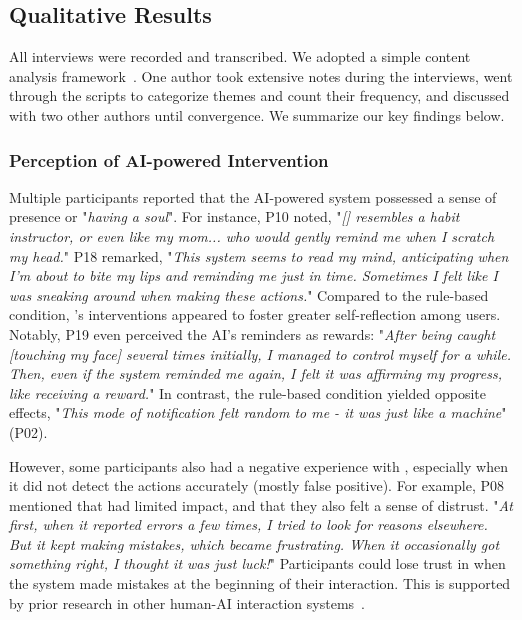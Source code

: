 \subsection{Qualitative Results}
\label{sub:intervention_evaluation:qualitative_results}
All interviews were recorded and transcribed. We adopted a simple content analysis framework~\cite{prior2014content}. One author took extensive notes during the interviews, went through the scripts to categorize themes and count their frequency, and discussed with two other authors until convergence.
We summarize our key findings below.


\subsubsection{Perception of AI-powered Intervention}
Multiple participants reported that the AI-powered system possessed a sense of presence or "\textit{having a soul}". For instance, P10 noted, "\textit{[\projectname{}] resembles a habit instructor, or even like my mom... who would gently remind me when I scratch my head.}"
P18 remarked, "\textit{This system seems to read my mind, anticipating when I'm about to bite my lips and reminding me just in time. Sometimes I felt like I was sneaking around when making these actions.}"
Compared to the rule-based condition, \projectname's interventions appeared to foster greater self-reflection among users.
Notably, P19 even perceived the AI's reminders as rewards: "\textit{After being caught [touching my face] several times initially, I managed to control myself for a while. Then, even if the system reminded me again, I felt it was affirming my progress, like receiving a reward.}"
In contrast, the rule-based condition yielded opposite effects, "\textit{This mode of notification felt random to me - it was just like a machine}" (P02).

However, some participants also had a negative experience with \projectname, especially when it did not detect the actions accurately (mostly false positive). For example, P08 mentioned that \projectname had limited impact, and that they also felt a sense of distrust. "\textit{At first, when it reported errors a few times, I tried to look for reasons elsewhere. But it kept making mistakes, which became frustrating. When it occasionally got something right, I thought it was just luck!}" Participants could lose trust in \projectname when the system made mistakes at the beginning of their interaction.
This is supported by prior research in other human-AI interaction systems~\cite{swaroop2024accuracy,jacobs2021designing}.


